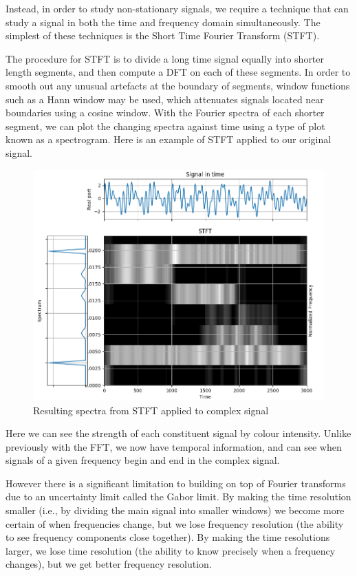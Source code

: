 \documentclass[
  paper=a4,
  ,captions=tableheading
]{scrartcl}
\begin{document}
Instead, in order to study non-stationary signals, we require a
technique that can study a signal in both the time and frequency domain
simultaneously. The simplest of these techniques is the Short Time
Fourier Transform (STFT).

The procedure for STFT is to divide a long time signal equally into
shorter length segments, and then compute a DFT on each of these
segments. In order to smooth out any unusual artefacts at the boundary
of segments, window functions such as a Hann window may be used, which
attenuates signals located near boundaries using a cosine window. With
the Fourier spectra of each shorter segment, we can plot the changing
spectra against time using a type of plot known as a spectrogram. Here
is an example of STFT applied to our original signal.

\begin{figure}
\centering
\includegraphics{img/stft_output_spectra.png}
\caption{Resulting spectra from STFT applied to complex signal}
\end{figure}

Here we can see the strength of each constituent signal by colour
intensity. Unlike previously with the FFT, we now have temporal
information, and can see when signals of a given frequency begin and end
in the complex signal.

However there is a significant limitation to building on top of Fourier
transforms due to an uncertainty limit called the Gabor limit. By making
the time resolution smaller (i.e., by dividing the main signal into
smaller windows) we become more certain of when frequencies change, but
we lose frequency resolution (the ability to see frequency components
close together). By making the time resolutions larger, we lose time
resolution (the ability to know precisely when a frequency changes), but
we get better frequency resolution.
\end{document}
